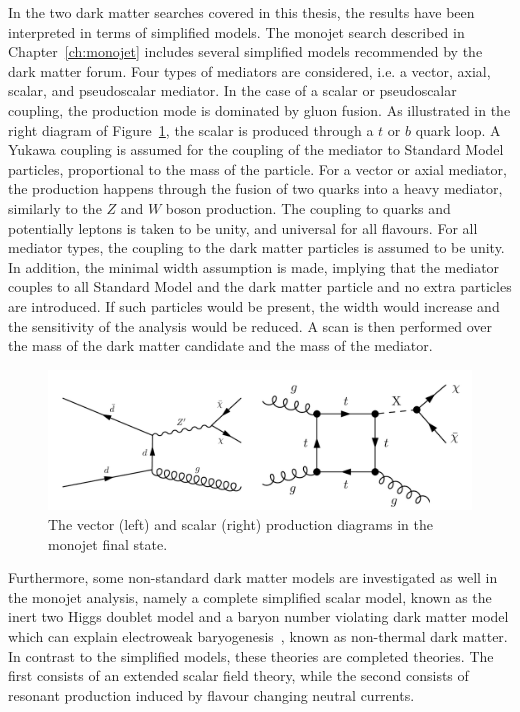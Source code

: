 In the two dark matter searches covered in this thesis, the results have been interpreted in terms of simplified models. The monojet search described in Chapter~\ref{ch:monojet} includes several simplified models recommended by the dark matter forum. Four types of mediators are considered, i.e. a vector, axial, scalar, and pseudoscalar mediator. In the case of a scalar or pseudoscalar coupling, the production mode is dominated by gluon fusion. As illustrated in the right diagram of Figure~\ref{fig:monojet_diagrams}, the scalar is produced through a $t$ or $b$ quark loop. A Yukawa coupling is assumed for the coupling of the mediator to Standard Model particles, proportional to the mass of the particle. For a vector or axial mediator, the production happens through the fusion of two quarks into a heavy mediator, similarly to the $Z$ and $W$ boson production. The coupling to quarks and potentially leptons is taken to be unity, and universal for all flavours. For all mediator types, the coupling to the dark matter particles is assumed to be unity. In addition, the minimal width assumption is made, implying that the mediator couples to all Standard Model and the dark matter particle and no extra particles are introduced. If such particles would be present, the width would increase and the sensitivity of the analysis would be reduced. A scan is then performed over the mass of the dark matter candidate and the mass of the mediator.

\begin{figure}[ht]
  \centering
 \includegraphics[width=.9\textwidth]{monojet_simplifiedmodel.png} 
 \caption{The vector (left) and scalar (right) production diagrams in the monojet final state.}
 \label{fig:monojet_diagrams}
\end{figure}

Furthermore, some non-standard dark matter models are investigated as well in the monojet analysis, namely a complete simplified scalar model, known as the inert two Higgs doublet model and a baryon number violating dark matter model which can explain electroweak baryogenesis~\cite{}, known as non-thermal dark matter. In contrast to the simplified models, these theories are completed theories. The first consists of an extended scalar field theory, while the second consists of resonant production induced by flavour changing neutral currents.


